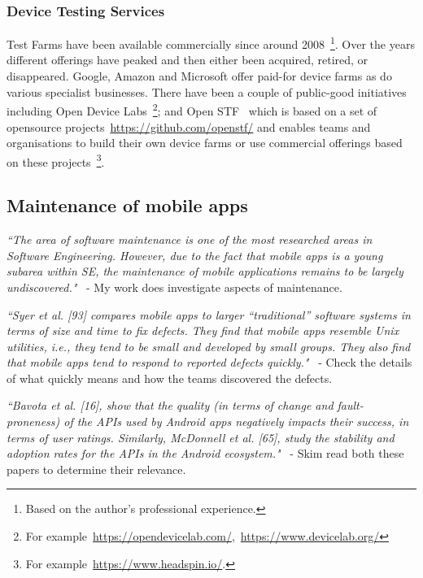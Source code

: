 \subsubsection{Device Testing Services}
Test Farms have been available commercially since around 2008~\footnote{Based on the author's professional experience.}. Over the years different offerings have peaked and then either been acquired, retired, or disappeared. Google, Amazon and Microsoft offer paid-for device farms as do various specialist businesses. There have been a couple of public-good initiatives including Open Device Labs~\footnote{For example~\url{https://opendevicelab.com/},~\url{https://www.devicelab.org/}}; and Open STF~ which is based on a set of opensource projects~\url{https://github.com/openstf/} and enables teams and organisations to build their own device farms or use commercial offerings based on these projects~\footnote{For example~\url{https://www.headspin.io/}.}.



\subsection{Maintenance of mobile apps}

\emph{``The area of software maintenance is one of the most researched areas in Software Engineering. However, due to the fact that mobile apps is a young subarea within SE, the maintenance of mobile applications remains to be largely undiscovered."}~\cite[p. 27]{nagappan2016_future_trends_in_sw_eng_for_mobile_apps} - My work does investigate aspects of maintenance. 

\emph{``Syer et al. [93] compares mobile apps to larger “traditional” software systems in terms of size and time to fix defects. They find that mobile apps resemble Unix utilities, i.e., they tend to be small and developed by small groups. They also find that mobile apps tend to respond to reported defects quickly."}~\cite[p. 27]{nagappan2016_future_trends_in_sw_eng_for_mobile_apps} - Check the details of what quickly means and how the teams discovered the defects.

\emph{``Bavota et al. [16], show that the quality (in terms of change and fault-proneness) of the APIs used by Android apps negatively impacts their success, in terms of user ratings. Similarly, McDonnell et al. [65], study the stability and adoption rates for the APIs in the Android ecosystem."}~\cite[p. 27]{nagappan2016_future_trends_in_sw_eng_for_mobile_apps} - Skim read both these papers to determine their relevance.

